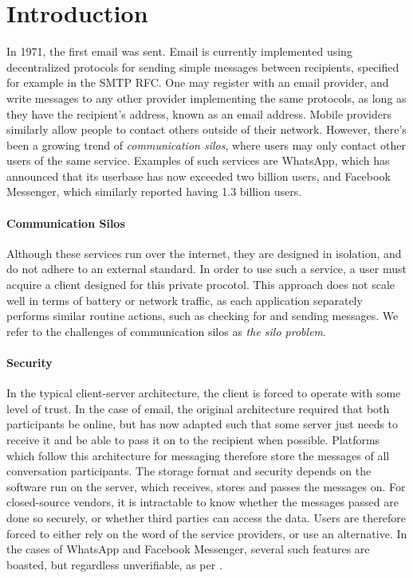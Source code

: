 \section{Introduction}
In 1971, the first email was sent\cite{tomlinson2009first}.
Email is currently implemented using decentralized protocols for sending simple messages between recipients, specified for example in the SMTP RFC\cite{RFC5321}.
One may register with an email provider, and write messages to any other provider implementing the same protocols, as long as they have the recipient's address, known as an email address.
Mobile providers similarly allow people to contact others outside of their network.
However, there's been a growing trend of \textit{communication silos}, where users may only contact other users of the same service.
Examples of such services are WhatsApp, which has announced that its userbase has now exceeded two billion users\cite{whatsapp_2b_users_archive_org}, and Facebook Messenger, which similarly reported having 1.3 billion users\cite{messenger_1pt3b_users}.

\paragraph{Communication Silos}
Although these services run over the internet, they are designed in isolation, and do not adhere to an external standard.
In order to use such a service, a user must acquire a client designed for this private procotol.
This approach does not scale well in terms of battery or network traffic, as each application separately performs similar routine actions, such as checking for and sending messages.
We refer to the challenges of communication silos as \textit{the silo problem}.

\paragraph{Security}
In the typical client-server architecture, the client is forced to operate with some level of trust.
In the case of email, the original architecture required that both participants be online, but has now adapted such that some server just needs to receive it and be able to pass it on to the recipient when possible\cite{tomlinson2009first}.
Platforms which follow this architecture for messaging therefore store the messages of all conversation participants.
The storage format and security depends on the software run on the server, which receives, stores and passes the messages on.
For closed-source vendors, it is intractable to know whether the messages passed are done so securely, or whether third parties can access the data.
Users are therefore forced to either rely on the word of the service providers, or use an alternative.
In the cases of WhatsApp and Facebook Messenger, several such features are boasted, but regardless unverifiable, as per \cite{twitter_comms_protocol_comparison}.

